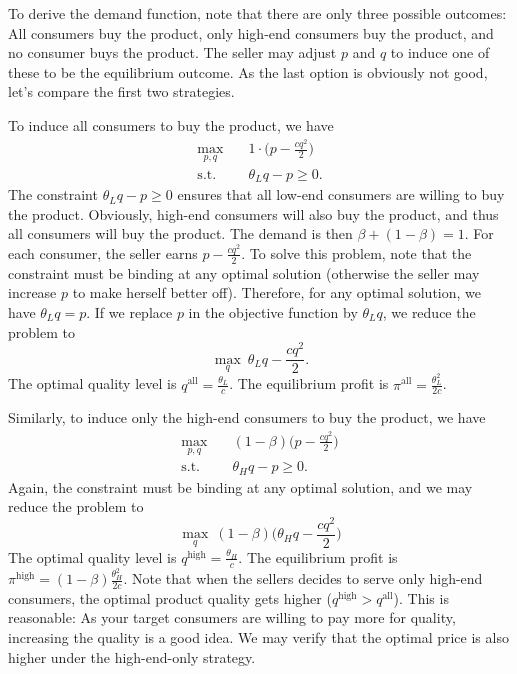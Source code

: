 \documentclass[11pt,a4paper]{article}
\begin{document}
To derive the demand function, note that there are only three possible outcomes:
All consumers buy the product, only high-end consumers buy the product,
and no consumer buys the product. The seller may adjust $p$ and $q$ to induce
one of these to be the equilibrium outcome. As the last option is obviously not good,
let's compare the first two strategies.

To induce all consumers to buy the product, we have
\[\begin{split}
		\max_{p, q} \quad & 1 \cdot \bigg(p - \frac{cq^2}{2}\bigg) \\
		\mbox{s.t.} \quad & \theta_L q - p \geq 0.
	\end{split}\]
The constraint $\theta_L q - p \geq 0$ ensures that all low-end consumers
are willing to buy the product. Obviously, high-end consumers will also
buy the product, and thus all consumers will buy the product.
The demand is then $\beta + (1 - \beta) = 1$.
For each consumer, the seller earns $p - \frac{cq^2}{2}$.
To solve this problem, note that the constraint must be binding at
any optimal solution (otherwise the seller may increase $p$ to make herself better
off). Therefore, for any optimal solution, we have $\theta_L q = p$.
If we replace $p$ in the objective function by $\theta_L q$,
we reduce the problem to
\[
	\max_q \ \theta_L q - \frac{cq^2}{2}.
\]
The optimal quality level is $q^{\mathrm{all}} = \frac{\theta_L}{c}$. The equilibrium
profit is $\pi^{\mathrm{all}} = \frac{\theta_L^2}{2c}$.

Similarly, to induce only the high-end consumers to buy the product, we have
\[\begin{split}
		\max_{p, q} \quad & (1 - \beta) \bigg(p - \frac{cq^2}{2}\bigg) \\
		\mbox{s.t.} \quad & \theta_H q - p \geq 0.
	\end{split}\]
Again, the constraint must be binding at
any optimal solution, and we may reduce the problem to
\[
	\max_q \ (1 - \beta) \bigg(\theta_H q - \frac{cq^2}{2}\bigg)
\]
The optimal quality level is $q^{\mathrm{high}} = \frac{\theta_H}{c}$. The equilibrium
profit is $\pi^{\mathrm{high}} = (1 - \beta)\frac{\theta_H^2}{2c}$.
Note that when the sellers decides to serve only high-end consumers,
the optimal product quality gets higher ($q^{\mathrm{high}} > q^{\mathrm{all}}$).
This is reasonable: As your target consumers are willing to pay more for quality,
increasing the quality is a good idea. We may verify that the optimal price
is also higher under the high-end-only strategy.
\end{document}

